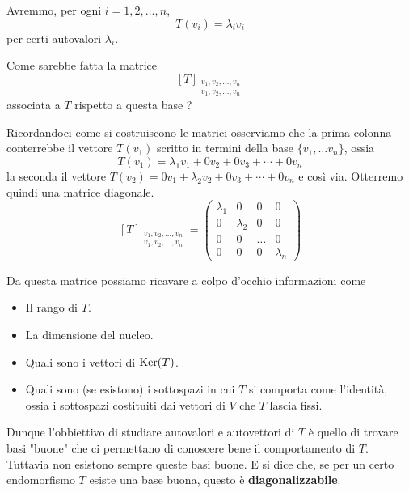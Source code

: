 Avremmo, per ogni $i = 1, 2, \dots, n$,
\[
	T(v_i) = \lambda_i v_i
\]
per certi autovalori $\lambda_i$.

Come sarebbe fatta la matrice
\[
	[T]_{\substack{
				v_1, v_2, \dots, v_n \\
				v_1, v_2, \dots, v_n
			}}
\]
associata a $T$ rispetto a questa base ?

Ricordandoci come si costruiscono le matrici osserviamo che la prima colonna
conterrebbe il vettore $T(v_1)$ scritto in termini della base $\{v_1, \dots v_n\}$,
ossia
\[
	T(v_1) = \lambda_1 v_1 + 0 v_2 + 0 v_3 + \cdots + 0 v_n
\]
la seconda il vettore $T(v_2) = 0 v_1 + \lambda_2 v_2 + 0 v_3 + \cdots + 0 v_n$ e
così via. Otterremo quindi una matrice diagonale.
\[
	[T]_{\substack{
				v_1, v_2, \dots, v_n \\
				v_1, v_2, \dots, v_n
			}} = \begin{pmatrix}
		\lambda_1 & 0         & 0     & 0         \\
		0         & \lambda_2 & 0     & 0         \\
		0         & 0         & \dots & 0         \\
		0         & 0         & 0     & \lambda_n
	\end{pmatrix}
\]

Da questa matrice possiamo ricavare a colpo d'occhio informazioni come
\begin{itemize}
	\item Il rango di $T$.
	\item La dimensione del nucleo.
	\item Quali sono i vettori di $\operatorname{Ker}(T)$.
	\item Quali sono (se esistono) i sottospazi in cui $T$ si comporta come l'identità,
	      ossia i sottospazi costituiti dai vettori di $V$ che $T$ lascia fissi.
\end{itemize}

Dunque l'obbiettivo di studiare autovalori e autovettori di $T$ è quello di
trovare basi "buone" che ci permettano di conoscere bene il comportamento di $T$.
Tuttavia non esistono sempre queste basi buone. E si dice che, se per un certo
endomorfismo $T$ esiste una base buona, questo è \textbf{diagonalizzabile}.

